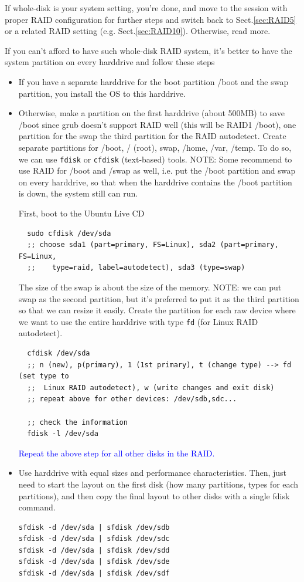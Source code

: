 If whole-disk is your system setting, you're done, and move to the session with
proper RAID configuration for further steps and switch back to
Sect.\ref{sec:RAID5} or a related RAID setting (e.g.
Sect.\ref{sec:RAID10}). Otherwise, read more.
 
If you can't afford to have such whole-disk RAID system, it's better to have the
system partition on every harddrive and follow these steps
\begin{itemize}
  \item If you have a separate harddrive for the boot partition /boot and the
  swap partition, you install the OS to this harddrive. 
    
  \item Otherwise, make a partition on the first harddrive (about 500MB) to save
  /boot since grub doesn't support RAID well (this will be RAID1 /boot), one
  partition for the swap the third partition for the RAID autodetect.
  Create separate partitions for /boot, / (root), swap, /home, /var,
  /temp.   To do so, we can use \verb!fdisk! or \verb!cfdisk! (text-based)
  tools.   NOTE: Some recommend to use RAID for /boot and /swap as well, i.e.
  put the /boot partition and swap on every harddrive, so that when the
  harddrive contains the /boot partition is down, the system still can run. 

  First, boot to the Ubuntu Live CD
  \begin{verbatim}
  sudo cfdisk /dev/sda
  ;; choose sda1 (part=primary, FS=Linux), sda2 (part=primary, FS=Linux,
  ;;    type=raid, label=autodetect), sda3 (type=swap)
  \end{verbatim}
  The size of the swap is about the size of the memory. NOTE: we can put swap
  as the second partition, but it's preferred to put it as the third partition
  so that we can resize it easily. Create the partition for each raw device
  where we want to use the entire harddrive with type \verb!fd! (for Linux RAID autodetect).
  \begin{verbatim}
  cfdisk /dev/sda
  ;; n (new), p(primary), 1 (1st primary), t (change type) --> fd (set type to 
  ;;  Linux RAID autodetect), w (write changes and exit disk)
  ;; repeat above for other devices: /dev/sdb,sdc...
  
  ;; check the information
  fdisk -l /dev/sda
  \end{verbatim}
  \textcolor{blue}{Repeat the above step for all other disks in the RAID.}
  
  \item  Use harddrive with equal sizes and performance characteristics. Then,
  just need to start the layout on the first disk (how many partitions, types
  for each partitions), and then copy the final layout to other disks with a
  single fdisk command.
  \begin{verbatim}
sfdisk -d /dev/sda | sfdisk /dev/sdb
sfdisk -d /dev/sda | sfdisk /dev/sdc
sfdisk -d /dev/sda | sfdisk /dev/sdd
sfdisk -d /dev/sda | sfdisk /dev/sde
sfdisk -d /dev/sda | sfdisk /dev/sdf
  \end{verbatim}
        

\end{itemize}
